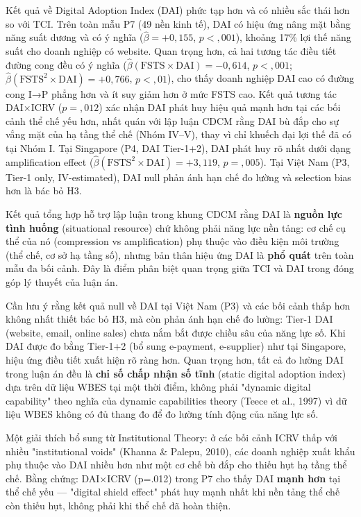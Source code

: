 \documentclass[12pt,a4paper]{article}
\begin{document}
Kết quả về Digital Adoption Index (DAI) phức tạp hơn và có nhiều sắc
thái hơn so với TCI. Trên toàn mẫu P7 (49 nền kinh tế), DAI có hiệu ứng
nâng mặt bằng năng suất dương và có ý nghĩa (\(\hat{\beta} = +0{,}155\),
\(p < {,}001\)), khoảng 17\% lợi thế năng suất cho doanh nghiệp có
website. Quan trọng hơn, cả hai tương tác điều tiết đường cong đều có ý
nghĩa (\(\hat{\beta}(\text{FSTS} \times \text{DAI}) = -0{,}614\),
\(p < {,}001\);
\(\hat{\beta}(\text{FSTS}^2 \times \text{DAI}) = +0{,}766\),
\(p < {,}01\)), cho thấy doanh nghiệp DAI cao có đường cong I→P phẳng
hơn và ít suy giảm hơn ở mức FSTS cao. Kết quả tương tác DAI×ICRV
(\(p = {,}012\)) xác nhận DAI phát huy hiệu quả mạnh hơn tại các bối
cảnh thể chế yếu hơn, nhất quán với lập luận CDCM rằng DAI bù đắp cho sự
vắng mặt của hạ tầng thể chế (Nhóm IV--V), thay vì chỉ khuếch đại lợi
thế đã có tại Nhóm I. Tại Singapore (P4, DAI Tier-1+2), DAI phát huy rõ
nhất dưới dạng amplification effect
(\(\hat{\beta}(\text{FSTS}^2 \times \text{DAI}) = +3{,}119\),
\(p = {,}005\)). Tại Việt Nam (P3, Tier-1 only, IV-estimated), DAI null
phản ánh hạn chế đo lường và selection bias hơn là bác bỏ H3.

Kết quả tổng hợp hỗ trợ lập luận trong khung CDCM rằng DAI là
\textbf{nguồn lực tình huống} (situational resource) chứ không phải năng
lực nền tảng: cơ chế cụ thể của nó (compression vs amplification) phụ
thuộc vào điều kiện môi trường (thể chế, cơ sở hạ tầng số), nhưng bản
thân hiệu ứng DAI là \textbf{phổ quát} trên toàn mẫu đa bối cảnh. Đây là
điểm phân biệt quan trọng giữa TCI và DAI trong đóng góp lý thuyết của
luận án.

Cần lưu ý rằng kết quả null về DAI tại Việt Nam (P3) và các bối cảnh
thấp hơn không nhất thiết bác bỏ H3, mà còn phản ánh hạn chế đo lường:
Tier-1 DAI (website, email, online sales) chưa nắm bắt được chiều sâu
của năng lực số. Khi DAI được đo bằng Tier-1+2 (bổ sung e-payment,
e-supplier) như tại Singapore, hiệu ứng điều tiết xuất hiện rõ ràng hơn.
Quan trọng hơn, tất cả đo lường DAI trong luận án đều là \textbf{chỉ số
chấp nhận số tĩnh} (static digital adoption index) dựa trên dữ liệu WBES
tại một thời điểm, không phải "dynamic digital capability" theo nghĩa
của dynamic capabilities theory (Teece et al., 1997) vì dữ liệu WBES
không có đủ thang đo để đo lường tính động của năng lực số.

Một giải thích bổ sung từ Institutional Theory: ở các bối cảnh ICRV thấp
với nhiều "institutional voids" (Khanna \& Palepu, 2010), các doanh
nghiệp xuất khẩu phụ thuộc vào DAI nhiều hơn như một cơ chế bù đắp cho
thiếu hụt hạ tầng thể chế. Bằng chứng: DAI×ICRV (p=.012) trong P7 cho
thấy DAI \textbf{mạnh hơn} tại thể chế yếu --- "digital shield effect"
phát huy mạnh nhất khi nền tảng thể chế còn thiếu hụt, không phải khi
thể chế đã hoàn thiện.
\end{document}
